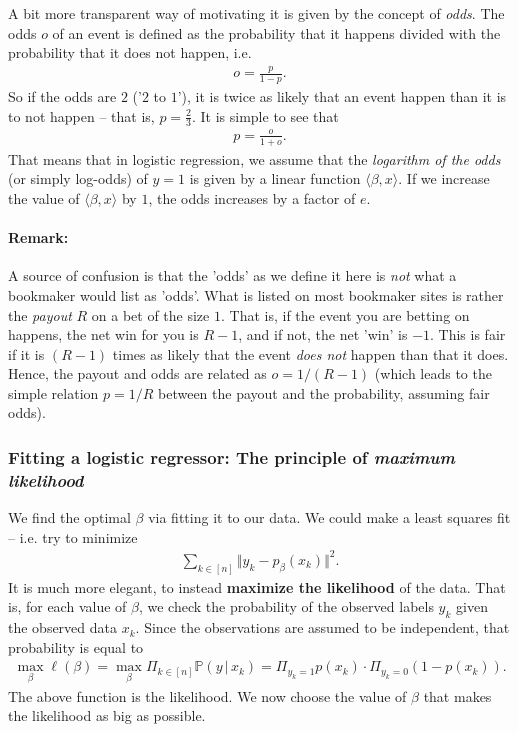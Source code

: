 \documentclass{article}
\newcommand{\sprod}[1]{\langle #1 \rangle}
\newcommand{\norm}[1]{\Vert #1 \Vert}
\begin{document}
A bit more transparent way of motivating it is given by the concept of \emph{odds}. The odds $o$ of an event is defined as the probability that it happens divided with the probability that it does not happen, i.e.
\begin{align*}
    o = \frac{p}{1-p}.
\end{align*}
So if the odds are $2$ ('$2$ to $1$'), it is twice as likely that an event happen than it is to not happen -- that is, $p=\tfrac{2}{3}$. It is simple to see that 
\begin{align*}
    p = \frac{o}{1+o}.
\end{align*}
That means that in logistic regression, we assume that the \emph{logarithm of the odds} (or simply log-odds) of $y=1$ is given by a linear function $\sprod{\beta,x}$. If we increase the value of $\sprod{\beta,x}$ by $1$, the odds increases by a factor of $e$.

\paragraph{Remark:} A source of confusion is that the 'odds' as we define it here is \emph{not} what a bookmaker would list as 'odds'. What is listed on most bookmaker sites is rather the \emph{payout} $R$ on a bet of the size $1$. That is, if the event you are betting on happens, the net win for you is $R-1$, and if not, the net 'win' is $-1$. This is fair if it is $(R-1)$ times as likely that the event \emph{does not} happen than that it does. Hence, the payout and odds are related as $o=1/(R-1)$ (which leads to the simple relation $p=1/R$ between the payout and the probability, assuming fair odds).


\subsubsection{Fitting a logistic regressor: The principle of \emph{maximum likelihood}}
We find the optimal $\beta$ via fitting it to our data. We could make a least squares fit -- i.e. try to minimize
\begin{align*}
    \sum_{k\in [n]} \norm{y_k - p_\beta(x_k)}^2.
\end{align*}
It is much more elegant, to instead \textbf{maximize the likelihood} of the data. That is, for each value of $\beta$, we check the probability of the observed labels $y_k$ given the observed data $x_k$. Since the observations are assumed to be independent, that probability is equal to
\begin{align*}
    \max_\beta \ell(\beta) =  \max_\beta \Pi_{k \in [n]} \mathbb{P}(y \,\vert \, x_k) = \Pi_{y_k =1} p(x_k)\cdot \Pi_{y_k=0} (1-p(x_k)).
\end{align*}
The above function is the likelihood. We now choose the value of $\beta$ that makes the likelihood as big as possible. 
\end{document}
